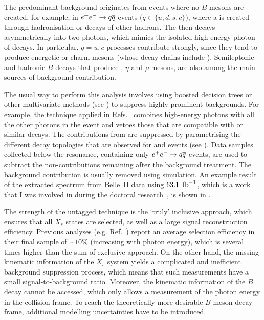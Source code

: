 The predominant background originates from events where no $B$ mesons are created,
for example, in $e^+e^-\rightarrow q\overline q$ events ($q\in\{u,d,s,c\}$), where a \piz is created through hadronisation or decays of other hadrons.
The \piz then decays asymmetrically into two photons, which mimics the isolated high-energy photon of \BtoXsgamma decays.
In particular, $q={u,c}$ processes contribute strongly, since they tend to produce energetic \piz or charm mesons (whose decay chains include \piz).
Semileptonic and hadronic $B$ decays that produce \piz, $\eta$ and $\rho$ mesons, are also among the main sources of background contribution.

The usual way to perform this analysis involves using boosted decision trees or other multivariate methods (see ) to suppress highly prominent backgrounds.
For example, the technique applied in Refs.~\cite{CLEO:2001gsa,Belle:2009nth} combines high-energy photons with all the other photons in the event and vetoes those that are compatible with \piz or similar decays.
The contributions from \epem\ra\qqbar are suppressed by parametrising the different decay topologies that are observed for \BB and \qqbar events (see ).
Data samples collected below the \FourS resonance, containing only $e^+e^-\rightarrow q\overline q$ events, are used to subtract the non-\BB contributions remaining after the background treatment.
The \BB background contribution is usually removed using simulation.
An example result of the extracted \BtoXsgamma spectrum from Belle~II data using $63.1~\mbox{\,fb}^{-1}$, which is a work that I was involved in during the doctoral research~\cite{Collaboration:2302}, is shown in .

The strength of the untagged technique is the `truly' inclusive approach, which ensures that all $X_s$ states are selected, as well as a large signal reconstruction efficiency.
Previous analyses (e.g. Ref.~\cite{Belle:2009nth}) report an average selection efficiency in their final sample of $\sim10\%$ (increasing with photon energy), which is several times higher than the sum-of-exclusive approach.
On the other hand, the missing kinematic information of the $X_s$ system yields a complicated and inefficient background suppression process, which means that such measurements have a small signal-to-background ratio.
Moreover, the kinematic information of the $B$ decay cannot be accessed, which only allows a measurement of the photon energy in the \epem collision frame.
To reach the theoretically more desirable $B$ meson decay frame, additional modelling uncertainties have to be introduced.

